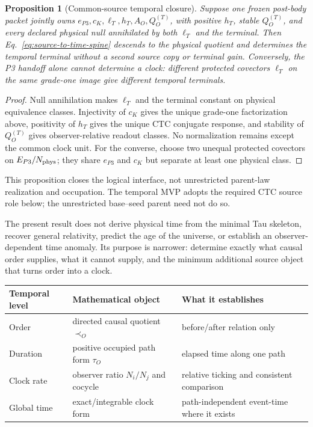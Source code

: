 \documentclass[11pt]{article}
\newtheorem{proposition}{Proposition}
\begin{document}
\begin{proposition}[Common-source temporal closure]
Suppose one frozen post-body packet jointly owns
\(e_{P3},c_K,\ell_T,h_T,A_O,Q_O^{(T)}\), with positive \(h_T\), stable
\(Q_O^{(T)}\), and every declared physical null annihilated by both
\(\ell_T\) and the terminal. Then Eq.~\eqref{eq:source-to-time-spine} descends
to the physical quotient and determines the temporal terminal without a
second source copy or terminal gain. Conversely, the P3 handoff alone cannot
determine a clock: different protected covectors \(\ell_T\) on the same
grade-one image give different temporal terminals.
\end{proposition}

\begin{proof}
Null annihilation makes \(\ell_T\) and the terminal constant on physical
equivalence classes. Injectivity of \(c_K\) gives the unique grade-one
factorization above, positivity of \(h_T\) gives the unique CTC conjugate
response, and stability of \(Q_O^{(T)}\) gives observer-relative readout
classes. No normalization remains except the common clock unit. For the
converse, choose two unequal protected covectors on \(E_{P3}/N_{\rm phys}\);
they share \(e_{P3}\) and \(c_K\) but separate at least one physical class.
\end{proof}

This proposition closes the logical interface, not unrestricted parent-law
realization and occupation. The
temporal MVP adopts the required CTC source role below; the unrestricted
base--seed parent need not do so.

The present result does not derive physical time from the minimal Tau skeleton,
recover general relativity, predict the age of the universe, or establish an
observer-dependent time anomaly. Its purpose is narrower: determine exactly
what causal order supplies, what it cannot supply, and the minimum additional
source object that turns order into a clock.

\begin{center}
\small
\begin{tabular}{p{.16\linewidth}p{.34\linewidth}p{.39\linewidth}}
\toprule
Temporal level & Mathematical object & What it establishes\\
\midrule
Order & directed causal quotient \(\prec_O\) & before/after relation only\\
Duration & positive occupied path form \(\tau_O\) & elapsed time along one path\\
Clock rate & observer ratio \(N_i/N_j\) and cocycle & relative ticking and consistent comparison\\
Global time & exact/integrable clock form & path-independent event-time where it exists\\
\bottomrule
\end{tabular}
\end{center}
\end{document}
